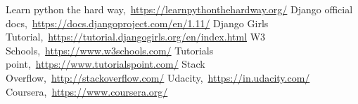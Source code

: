\cleardoublepage
{}
{}
\begin{thebibliography}{99}

\bibitem{}Learn python the hard way,\ \url{https://learnpythonthehardway.org/}
\bibitem{}Django official docs,\ \url{https://docs.djangoproject.com/en/1.11/}
\bibitem{}Django Girls Tutorial,\ \url{https://tutorial.djangogirls.org/en/index.html}
\bibitem{}W3 Schools,\ \url{https://www.w3schools.com/}
\bibitem{}Tutorials point,\ \url{https://www.tutorialspoint.com/}
\bibitem{}Stack Overflow,\ \url{http://stackoverflow.com/}
\bibitem{}Udacity,\ \url{https://in.udacity.com/}
\bibitem{}Coursera,\ \url{https://www.coursera.org/}

\end{thebibliography}
